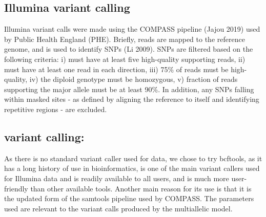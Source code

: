 \subsection{Illumina variant calling}

Illumina variant calls were made using the COMPASS pipeline (Jajou 2019) used by Public Health England (PHE). Briefly, reads are mapped to the \mtb{} reference genome, and  is used to identify SNPs (Li 2009). SNPs are filtered based on the following criteria: i) must have at least five high-quality supporting reads, ii) must have at least one read in each direction, iii) 75\% of reads must be high-quality, iv) the diploid genotype must be homozygous, v) fraction of reads supporting the major allele must be at least 90\%. In addition, any SNPs falling within masked sites - as defined by aligning the \mtb{} reference to itself and identifying repetitive regions - are excluded.

\subsection{\ont{} variant calling: }
\label{sec:bcftools-filters}

As there is no standard variant caller used for \mtb{} \ont{} data, we chose to try bcftools, as it has a long history of use in bioinformatics, is one of the main variant callers used for Illumina data  and is readily available to all users, and is much more user-friendly than other available tools. Another main reason for its use is that it is the updated form of the samtools pipeline used by COMPASS. The parameters used are
relevant to the variant calls produced by the multiallelic
model.

